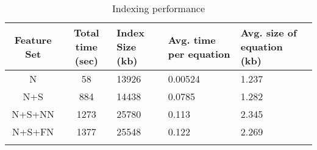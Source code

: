 \begin{longtable}{|c|c|p{2cm}|p{2cm}|p{2cm}|}
\hline 
Feature Set & Total time (sec) & Index Size (kb) & Avg. time per equation & Avg. size of equation (kb) \\ 
\hline 
N & 58 & 13926 & 0.00524 & 1.237 \\ 
\hline 
N+S & 884 & 14438 & 0.0785 & 1.282 \\ 
\hline 
N+S+NN & 1273 & 25780 & 0.113 & 2.345 \\ 
\hline 
N+S+FN & 1377 & 25548 & 0.122 & 2.269 \\ 
\hline
\caption{Indexing performance}
\label{indexing_performance}
\end{longtable} 

















